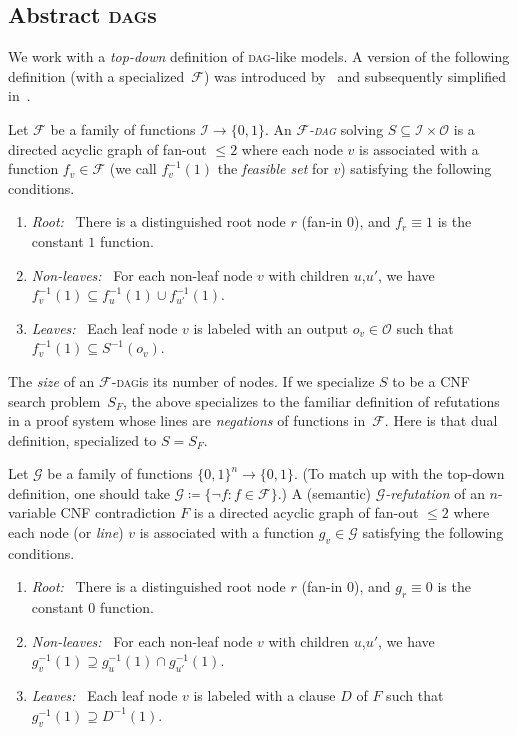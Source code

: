 \documentclass[11pt]{article}
\numberwithin{equation}{section}
\theoremstyle{definition}
\theoremstyle{plain}
\newcommand{\DAG}{\textsc{dag}}
\newcommand{\DAGs}{\textsc{dag}s\xspace}
\newcommand{\calI}{\mathcal{I}}
\newcommand{\calO}{\mathcal{O}}
\newcommand{\calF}{\mathcal{F}}
\newcommand{\calG}{\mathcal{G}}
\begin{document}
\subsection{Abstract \DAGs} \label{sec:defs}
We work with a \emph{top-down} definition of \DAG-like models. A version of the following definition (with a specialized~$\calF$) was introduced by~\cite{razborov95unprovability} and subsequently simplified in~\cite{pudlak10extracting,sokolov17dag}.
\begin{top-down}
Let $\calF$ be a family of functions $\calI\to\{0,1\}$. An \emph{$\calF$-\DAG} solving $S\subseteq \calI\times\calO$ is a directed acyclic graph of fan-out $\leq 2$ where each node $v$ is associated with a function $f_v\in\calF$ (we call $f^{-1}_v(1)$ the \emph{feasible set} for $v$) satisfying the 
%
following conditions.  %
\begin{enumerate}
\item \emph{Root:}~ There is a distinguished root node $r$ (fan-in 0), and $f_r\equiv 1$ is the constant $1$ function.
\item \emph{Non-leaves:}~ For each non-leaf node $v$ with children $u$,$u'$, we have $f^{-1}_v(1)\subseteq f^{-1}_u(1)\cup f^{-1}_{u'}(1)$.
\item \emph{Leaves:}~ Each leaf node $v$ is labeled with an output $o_v\in \calO$ such that $f_v^{-1}(1)\subseteq S^{-1}(o_v)$.
\end{enumerate}
\end{top-down}

The \emph{size} of an $\calF$-\DAG is its number of nodes. If we specialize $S$ to be a CNF search problem~$S_F$, the above specializes to the familiar definition of refutations in a proof system whose lines are \emph{negations} of functions in~$\calF$. Here is that dual definition, specialized to $S=S_F$.
\begin{bottom-up}
Let $\calG$ be a family of functions $\{0,1\}^n\to\{0,1\}$. (To match up with the top-down definition, one should take $\calG\coloneqq\{\neg f : f\in \calF\}$.) A (semantic) \emph{$\calG$-refutation} of an $n$-variable CNF contradiction $F$ is a directed acyclic graph of fan-out $\leq 2$ where each node (or \emph{line}) $v$ is associated with a function $g_v\in\calG$ satisfying the 
%
following conditions.  %
\begin{enumerate}
\item \emph{Root:}~ There is a distinguished root node $r$ (fan-in 0), and $g_r\equiv 0$ is the constant $0$ function.
\item \emph{Non-leaves:}~ For each non-leaf node $v$ with children $u$,$u'$, we have $g^{-1}_v(1)\supseteq g^{-1}_u(1)\cap g^{-1}_{u'}(1)$.
\item \emph{Leaves:}~ Each leaf node $v$ is labeled with a clause $D$ of $F$ such that $g_v^{-1}(1)\supseteq D^{-1}(1)$.
\end{enumerate}
\end{bottom-up}
\end{document}
